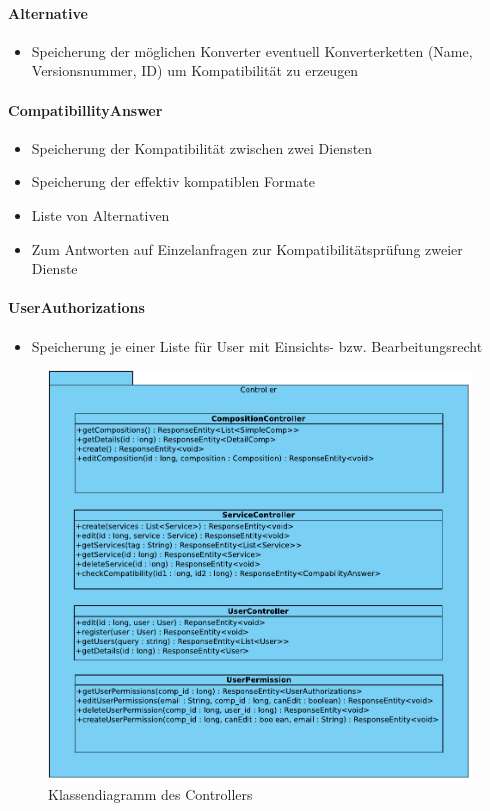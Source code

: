 \paragraph{Alternative}
\begin{itemize}
	\item Speicherung der möglichen Konverter eventuell Konverterketten (Name, Versionsnummer, ID) um Kompatibilität zu erzeugen
\end{itemize}
\paragraph{CompatibillityAnswer}
\begin{itemize}
	\item Speicherung der Kompatibilität zwischen zwei Diensten
	\item Speicherung der effektiv kompatiblen Formate
	\item Liste von Alternativen
	\item Zum Antworten auf Einzelanfragen zur Kompatibilitätsprüfung zweier Dienste
\end{itemize}
\paragraph{UserAuthorizations}
\begin{itemize}
	\item Speicherung je einer Liste für User mit Einsichts- bzw. Bearbeitungsrecht
\end{itemize}


\begin{figure}[!h]
	\centering
	\includegraphics[width=\textwidth]{img/Diagramme/Klassen/Controller}
	\caption{Klassendiagramm des Controllers}
	\label{fig:klassendiagramm-controller}
\end{figure}


